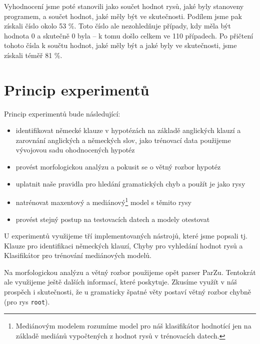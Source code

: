 \documentclass[12pt,a4paper]{report}
\begin{document}
Vyhodnocení jsme poté stanovili jako součet hodnot rysů, jaké byly stanoveny programem, a součet hodnot, jaké měly být ve skutečnosti. Podílem jsme pak získali číslo okolo 53 \%. Toto číslo ale nezohledňuje případy, kdy měla být hodnota 0 a skutečně 0 byla -- k tomu došlo celkem ve 110 případech. Po přičtení tohoto čísla k součtu hodnot, jaké měly být a jaké byly ve skutečnosti, jsme získali téměř 81 \%.


\section{Princip experimentů}

Princip experimentů bude následující:
\begin{itemize}
\item{identifikovat německé klauze v hypotézách na základě anglických klauzí a zarovnání anglických a německých slov, jako trénovací data použijeme vývojovou sadu ohodnocených hypotéz}
\item{provést morfologickou analýzu a pokusit se o větný rozbor hypotéz}
\item{uplatnit naše pravidla pro hledání gramatických chyb a použít je jako rysy}
\item{natrénovat maxentový a mediánový\footnote{Mediánovým modelem rozumíme model pro náš klasifikátor hodnotící jen na základě mediánů vypočtených z hodnot rysů v trénovacích datech.} model s těmito rysy}
\item{provést stejný postup na testovacích datech a modely otestovat}
\end{itemize}

U experimentů využijeme tří implementovaných nástrojů, které jsme popsali tj. Klauze pro identifikaci německých klauzí, Chyby pro vyhledání hodnot rysů a Klasifikátor pro trénování mediánových modelů.

Na morfologickou analýzu a větný rozbor použijeme opět parser ParZu. Tentokrát ale využijeme ještě dalších informací, které poskytuje. Zkusíme využít v náš prospěch i skutečnosti, že u gramaticky špatné věty postaví větný rozbor chybně (pro rys \texttt{root}).

\end{document}
